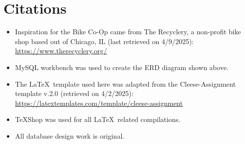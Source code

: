 \documentclass{article}
\begin{document}
\section{Citations}
\begin{tcolorbox}[colback=secondarycolor, colframe=primarycolor, arc=5mm]
\begin{itemize}
  \item Inspiration for the Bike Co-Op came from The Recyclery, a non-profit bike shop based out of Chicago, IL (last retrieved on 4/9/2025): \href{https://www.therecyclery.org/}{https://www.therecyclery.org/}
  
  \vspace{0.2cm}
  
  \item MySQL workbench was used to create the ERD diagram shown above.
  
  \vspace{0.2cm}
  
  \item The \LaTeX\ template used here was adapted from the Cleese-Assignment template v.2.0 (retrieved on 4/2/2025): \href{https://latextemplates.com/template/cleese-assignment}{https://latextemplates.com/template/cleese-assignment}
  
  \vspace{0.2cm}
  
  \item TeXShop was used for all \LaTeX\ related compilations.
  
  \vspace{0.2cm}
  
  \item All database design work is original.
\end{itemize}
\end{tcolorbox}
\end{document}
